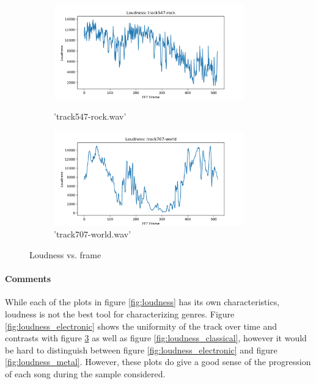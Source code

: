 \documentclass[11pt,a4paper]{article}
\begin{document}
\begin{figure}[tb]\ContinuedFloat
	\begin{subfigure}[t]{\hsize}
		\centering
		\includegraphics[width=0.9\textwidth]{loudness_track547-rock}
		\label{fig:loudness_rock}
		\caption{'track547-rock.wav'}
	\end{subfigure}
	\begin{subfigure}[t]{\hsize}
		\centering
		\includegraphics[width=0.9\textwidth]{loudness_track707-world}
		\caption{'track707-world.wav'}
		\label{fig:loudness_world}
	\end{subfigure}
\caption{Loudness vs. frame}
\end{figure}
\clearpage

\paragraph*{Comments} While each of the plots in figure \ref{fig:loudness} has its own characteristics, loudness is not the best tool for characterizing genres. Figure \ref{fig:loudness_electronic} shows the uniformity of the track over time and contrasts with figure \ref{fig:loudness_world} as well as figure \ref{fig:loudness_classical}, however it would be hard to distinguish between figure \ref{fig:loudness_electronic} and figure \ref{fig:loudness_metal}. However, these plots do give a good sense of the progression of each song during the sample considered.
\end{document}
